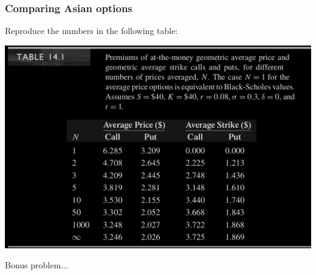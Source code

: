 \begin{frame}[fragile,t]
	\frametitle{Comparing Asian options}
	\begin{myexample}
		Reproduce the numbers in the following table:
	\end{myexample}
	\begin{center}
		\includegraphics[scale=0.22]{figs/Table14-1.png}
	\end{center}
	\begin{mysol}
		Bonus problem... \myEnd
	\end{mysol}
\end{frame}
